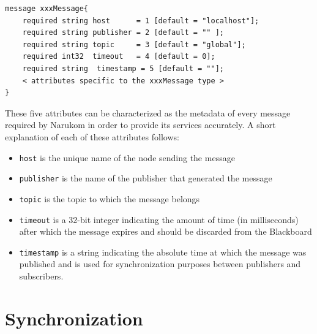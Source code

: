 \begin{verbatim}
message xxxMessage{
    required string host      = 1 [default = "localhost"];
    required string publisher = 2 [default = "" ];
    required string topic     = 3 [default = "global"];
    required int32  timeout   = 4 [default = 0];
    required string  timestamp = 5 [default = ""];
    < attributes specific to the xxxMessage type >
}
\end{verbatim} 
These five attributes can be characterized as the metadata of every message required by Narukom in order to provide its
services accurately. A short explanation of each of these attributes follows:
\begin{itemize}
\item {\tt host} is the unique name of the node sending the message
\item{\tt publisher} is the name of the publisher that generated the message
\item{\tt topic} is the topic to which the message belongs
\item{\tt timeout} is a 32-bit integer indicating the amount of time (in milliseconds) after which the message expires
and should be discarded from the Blackboard
\item{\tt timestamp} is a string indicating the absolute time at which the message was published and is used for
synchronization purposes between publishers and subscribers.
\end{itemize}



\section{Synchronization}

